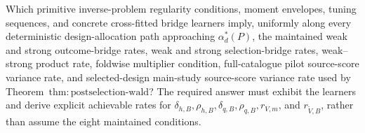 Which primitive inverse-problem regularity conditions, moment envelopes, tuning sequences, and concrete cross-fitted bridge learners imply, uniformly along every deterministic design-allocation path approaching \(\alpha_d^*(P)\), the maintained weak and strong outcome-bridge rates, weak and strong selection-bridge rates, weak--strong product rate, foldwise multiplier condition, full-catalogue pilot source-score variance rate, and selected-design main-study source-score variance rate used by Theorem~\(\mathrm{thm{:}postselection\text{-}wald}\)?  The required answer must exhibit the learners and derive explicit achievable rates for \(\delta_{h,B},\rho_{h,B},\delta_{q,B},\rho_{q,B},r_{V,m}\), and \(r_{\widetilde V,B}\), rather than assume the eight maintained conditions.
